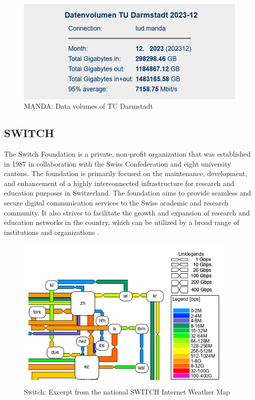 \documentclass[sigconf,authorversion,nonacm]{acmart}
\begin{document}
\begin{figure}
    \centering
    \includegraphics[width=\linewidth]{MANDA/pastedImage.png}
    \caption{MANDA: Data volumes of TU Darmstadt}
    \label{MANDA: Data volumes of TU Darmstadt}
\end{figure}

\subsection{SWITCH}

The Switch Foundation is a private, non-profit organization that was established in 1987 in collaboration with the Swiss Confederation and eight university cantons. The foundation is primarily focused on the maintenance, development, and enhancement of a highly interconnected infrastructure for research and education purposes in Switzerland. The foundation aims to provide seamless and secure digital communication services to the Swiss academic and research community. It also strives to facilitate the growth and expansion of research and education networks in the country, which can be utilized by a broad range of institutions and organizations \cite{switch}.

\begin{figure}
    \centering
    \includegraphics[width=\linewidth]{SWITCH/switch.PNG}
    \caption{Switch: Excerpt from the national SWITCH Internet Weather Map}
    \label{SWITCH: National SWITCH Internet Weather Map}
\end{figure}
\end{document}
